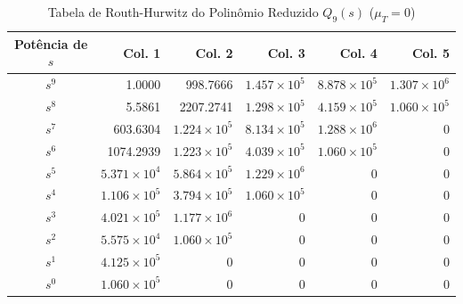
\begin{table}[htbp]
\centering
\caption{Tabela de Routh-Hurwitz do Polinômio Reduzido $Q_9(s)$ ($\mu_T = 0$)}
\begin{tabular}{c|rrrrr}
\hline
Potência de $s$ & Col. 1 & Col. 2 & Col. 3 & Col. 4 & Col. 5 \\
\hline
$s^9$ & 1.0000 & 998.7666 & $1.457 \times 10^{5}$ & $8.878 \times 10^{5}$ & $1.307 \times 10^{6}$ \\
$s^8$ & 5.5861 & 2207.2741 & $1.298 \times 10^{5}$ & $4.159 \times 10^{5}$ & $1.060 \times 10^{5}$ \\
$s^7$ & 603.6304 & $1.224 \times 10^{5}$ & $8.134 \times 10^{5}$ & $1.288 \times 10^{6}$ & 0 \\
$s^6$ & 1074.2939 & $1.223 \times 10^{5}$ & $4.039 \times 10^{5}$ & $1.060 \times 10^{5}$ & 0 \\
$s^5$ & $5.371 \times 10^{4}$ & $5.864 \times 10^{5}$ & $1.229 \times 10^{6}$ & 0 & 0 \\
$s^4$ & $1.106 \times 10^{5}$ & $3.794 \times 10^{5}$ & $1.060 \times 10^{5}$ & 0 & 0 \\
$s^3$ & $4.021 \times 10^{5}$ & $1.177 \times 10^{6}$ & 0 & 0 & 0 \\
$s^2$ & $5.575 \times 10^{4}$ & $1.060 \times 10^{5}$ & 0 & 0 & 0 \\
$s^1$ & $4.125 \times 10^{5}$ & 0 & 0 & 0 & 0 \\
$s^0$ & $1.060 \times 10^{5}$ & 0 & 0 & 0 & 0 \\
\hline
\end{tabular}
\end{table}



